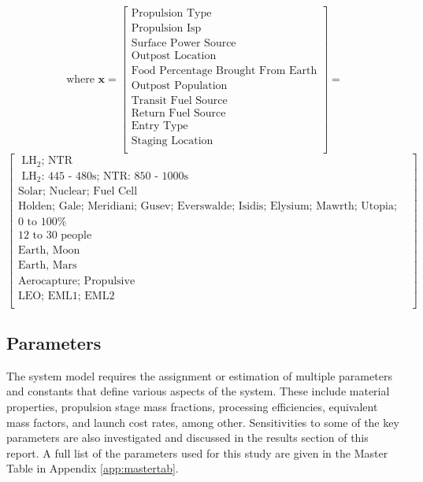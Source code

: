 \documentclass[]{aiaa-pretty}
\begin{document}
\begin{equation*}
\mbox{where } \mathbf{x}
=
\begin{bmatrix}
\mbox{Propulsion Type}\\
\mbox{Propulsion Isp}\\
\mbox{Surface Power Source}\\
\mbox{Outpost Location}\\
\mbox{Food Percentage Brought From Earth}\\
\mbox{Outpost Population}\\
\mbox{Transit Fuel Source}\\
\mbox{Return Fuel Source}\\
\mbox{Entry Type}\\
\mbox{Staging Location}\\
\end{bmatrix}
=
\end{equation*}
\begin{equation*}
\begin{bmatrix}
\mbox{ LH$_2$; NTR}\\
\mbox{ LH$_2$: 445 - 480s; NTR: 850 - 1000s}\\
\mbox{Solar; Nuclear; Fuel Cell}\\
\mbox{Holden; Gale; Meridiani; Gusev; Everswalde; Isidis; Elysium; Mawrth; Utopia; Planus Boreum; Hellas; Amazonis}\\
\mbox{0 to 100\%}\\
\mbox{12 to 30 people}\\
\mbox{Earth, Moon}\\
\mbox{Earth, Mars}\\
\mbox{Aerocapture; Propulsive}\\
\mbox{LEO; EML1; EML2}\\
\end{bmatrix}
\end{equation*}

\subsection{Parameters}
\label{sec:params}
The system model requires the assignment or estimation of multiple parameters and constants that define various aspects of the system. These include material properties, propulsion stage mass fractions, processing efficiencies, equivalent mass factors, and launch cost rates, among other. Sensitivities to some of the key parameters are also investigated and discussed in the results section of this report. A full list of the parameters used for this study are given in the Master Table in Appendix \ref{app:mastertab}. %
\end{document}
